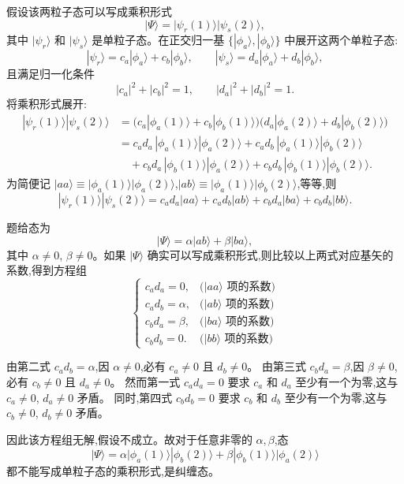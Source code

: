 \begin{solution}
假设该两粒子态可以写成乘积形式
\[
|\Psi\rangle=|\psi_r(1)\rangle|\psi_s(2)\rangle,
\]
其中 $|\psi_r\rangle$ 和 $|\psi_s\rangle$ 是单粒子态。在正交归一基 $\{|\phi_a\rangle,|\phi_b\rangle\}$ 中展开这两个单粒子态:
\[
|\psi_r\rangle=c_a|\phi_a\rangle+c_b|\phi_b\rangle,\qquad
|\psi_s\rangle=d_a|\phi_a\rangle+d_b|\phi_b\rangle,
\]
且满足归一化条件
\[
|c_a|^2+|c_b|^2=1,\qquad |d_a|^2+|d_b|^2=1.
\]
将乘积形式展开:
\[
\begin{aligned}
|\psi_r(1)\rangle|\psi_s(2)\rangle
&=\bigl(c_a|\phi_a(1)\rangle+c_b|\phi_b(1)\rangle\bigr)\bigl(d_a|\phi_a(2)\rangle+d_b|\phi_b(2)\rangle\bigr)\\[2mm]
&=c_a d_a\,|\phi_a(1)\rangle|\phi_a(2)\rangle
+ c_a d_b\,|\phi_a(1)\rangle|\phi_b(2)\rangle\\
&\quad + c_b d_a\,|\phi_b(1)\rangle|\phi_a(2)\rangle
+ c_b d_b\,|\phi_b(1)\rangle|\phi_b(2)\rangle.
\end{aligned}
\]
为简便记 $|aa\rangle\equiv|\phi_a(1)\rangle|\phi_a(2)\rangle$,$|ab\rangle\equiv|\phi_a(1)\rangle|\phi_b(2)\rangle$,等等,则
\[
|\psi_r(1)\rangle|\psi_s(2)\rangle
=c_a d_a|aa\rangle + c_a d_b|ab\rangle + c_b d_a|ba\rangle + c_b d_b|bb\rangle.
\]

题给态为
\[
|\Psi\rangle=\alpha|ab\rangle+\beta|ba\rangle,
\]
其中 $\alpha\neq0$, $\beta\neq0$。如果 $|\Psi\rangle$ 确实可以写成乘积形式,则比较以上两式对应基矢的系数,得到方程组
\[
\begin{cases}
c_a d_a = 0, & \text{($|aa\rangle$ 项的系数)}\\[2pt]
c_a d_b = \alpha, & \text{($|ab\rangle$ 项的系数)}\\[2pt]
c_b d_a = \beta, & \text{($|ba\rangle$ 项的系数)}\\[2pt]
c_b d_b = 0. & \text{($|bb\rangle$ 项的系数)}
\end{cases}
\]

由第二式 $c_a d_b = \alpha$,因 $\alpha\neq0$,必有 $c_a\neq0$ 且 $d_b\neq0$。
由第三式 $c_b d_a = \beta$,因 $\beta\neq0$,必有 $c_b\neq0$ 且 $d_a\neq0$。
然而第一式 $c_a d_a = 0$ 要求 $c_a$ 和 $d_a$ 至少有一个为零,这与 $c_a\neq0$, $d_a\neq0$ 矛盾。
同时,第四式 $c_b d_b = 0$ 要求 $c_b$ 和 $d_b$ 至少有一个为零,这与 $c_b\neq0$, $d_b\neq0$ 矛盾。

因此该方程组无解,假设不成立。故对于任意非零的 $\alpha,\beta$,态
\[
\boxed{|\Psi\rangle=\alpha|\phi_a(1)\rangle|\phi_b(2)\rangle+\beta|\phi_b(1)\rangle|\phi_a(2)\rangle}
\]
都不能写成单粒子态的乘积形式,是纠缠态。
\end{solution}

